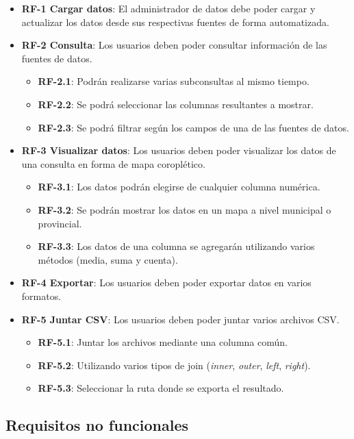 \begin{itemize}
	\item \textbf{RF-1 Cargar datos}: El administrador de datos debe poder cargar y actualizar los datos desde sus respectivas fuentes de forma automatizada.
	\item \textbf{RF-2 Consulta}: Los usuarios deben poder consultar información de las fuentes de datos.
	\begin{itemize}
		\item \textbf{RF-2.1}: Podrán realizarse varias subconsultas al mismo tiempo.
		\item \textbf{RF-2.2}: Se podrá seleccionar las columnas resultantes a mostrar.
		\item \textbf{RF-2.3}: Se podrá filtrar según los campos de una de las fuentes de datos.
	\end{itemize}
	\item \textbf{RF-3 Visualizar datos}: Los usuarios deben poder visualizar los datos de una consulta en forma de mapa coroplético.
	\begin{itemize}
		\item \textbf{RF-3.1}: Los datos podrán elegirse de cualquier columna numérica.
		\item \textbf{RF-3.2}: Se podrán mostrar los datos en un mapa a nivel municipal o provincial.
		\item \textbf{RF-3.3}: Los datos de una columna se agregarán utilizando varios métodos (media, suma y cuenta).
	\end{itemize}
	\item \textbf{RF-4 Exportar}: Los usuarios deben poder exportar datos en varios formatos.
	\item \textbf{RF-5 Juntar CSV}: Los usuarios deben poder juntar varios archivos CSV.
		\begin{itemize}
		\item \textbf{RF-5.1}: Juntar los archivos mediante una columna común.
		\item \textbf{RF-5.2}: Utilizando varios tipos de join (\textit{inner}, \textit{outer}, \textit{left}, \textit{right}).
		\item \textbf{RF-5.3}: Seleccionar la ruta donde se exporta el resultado.
	\end{itemize}
\end{itemize}

\subsection{Requisitos no funcionales}

